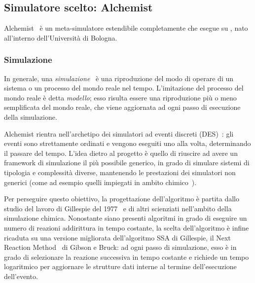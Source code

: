 \subsection{Simulatore scelto: Alchemist}\label{subsec:alchemist}
  Alchemist~\cite{alchemist-jos2013} è un meta-simulatore estendibile completamente  che esegue su , nato all'interno dell'Università di Bologna.

  \subsubsection{Simulazione}\label{subsec:introAlchemist}
    In generale, una \emph{simulazione}~\cite{des3} è una riproduzione del modo di operare di un sistema o un processo del mondo reale nel tempo.
    L'imitazione del processo del mondo reale è detta \emph{modello};
    esso risulta essere una riproduzione più o meno semplificata del mondo reale, che viene aggiornata ad ogni passo di esecuzione della simulazione.

    Alchemist rientra nell'archetipo dei simulatori ad eventi discreti (DES)~\cite{des, des2}:
    gli eventi sono strettamente ordinati e vengono eseguiti uno alla volta, determinando il passare del tempo.
    L'idea dietro al progetto è quello di riuscire ad avere un framework di simulazione il più possibile generico, in grado di simulare sistemi di tipologia e complessità diverse, mantenendo le prestazioni dei simulatori non generici (come ad esempio quelli impiegati in ambito chimico~\cite{gillespie1976}).

    Per perseguire questo obiettivo, la progettazione dell'algoritmo è partita dallo studio del lavoro di Gillespie del 1977~\cite{gillespie1977} e di altri scienziati nell'ambito della simulazione chimica.
    Nonostante siano presenti algoritmi in grado di eseguire un numero di reazioni addirittura in tempo costante, la scelta dell'algoritmo è infine ricaduta su una versione migliorata dell'algoritmo SSA di Gillespie, il Next Reaction Method~\cite{nextReactionMethod} di Gibson e Bruck:
    ad ogni passo di simulazione, esso è in grado di selezionare la reazione successiva in tempo costante e richiede un tempo logaritmico per aggiornare le strutture dati interne al termine dell'esecuzione dell'evento.

